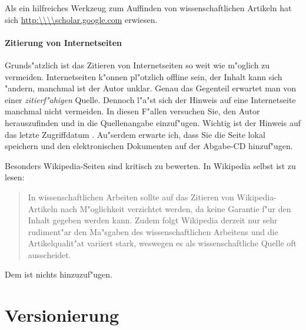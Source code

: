 \documentclass[12pt,a4paper,headinclude,twoside, plainheadsepline, open=right,numbers=noenddot]{scrreprt}
\begin{document}
Als ein hilfreiches Werkzeug zum Auffinden von wissenschaftlichen Artikeln hat sich \url{http:\\\\scholar.google.com} erwiesen.

\paragraph{Zitierung von Internetseiten}
Grunds"atzlich ist das Zitieren von Internetseiten so weit wie m"oglich zu vermeiden.
Internetseiten k"onnen pl"otzlich offline sein, der Inhalt kann sich "andern, manchmal ist der Autor unklar.
Genau das Gegenteil erwartet man von einer \emph{zitierf"ahigen} Quelle.
Dennoch l"a"st sich der Hinweis auf eine Internetseite manchmal nicht vermeiden.
In diesen F"allen versuchen Sie, den Autor herauszufinden und in die Quellenangabe einzuf"ugen.
Wichtig ist der Hinweis auf das letzte Zugriffdatum \cite{zitieren13}.
Au"serdem erwarte ich, dass Sie die Seite lokal speichern und den elektronischen Dokumenten auf der Abgabe-CD hinzuf"ugen.

Besonders Wikipedia-Seiten sind kritisch zu bewerten. In Wikipedia selbst ist zu lesen:
\begin{quote}
\glqq In wissenschaftlichen Arbeiten sollte auf das Zitieren von Wikipedia-Artikeln nach M"oglichkeit verzichtet werden, da keine Garantie f"ur den Inhalt gegeben werden kann.
Zudem folgt Wikipedia derzeit nur sehr rudiment"ar den Ma"sgaben des wissenschaftlichen Arbeitens und die Artikelqualit"at variiert stark, weswegen es als wissenschaftliche Quelle oft ausscheidet.\grqq \cite{zitieren13a}
\end{quote}
Dem ist nichts hinzuzuf"ugen.

\section{Versionierung}
\label{versionierung}
\end{document}
